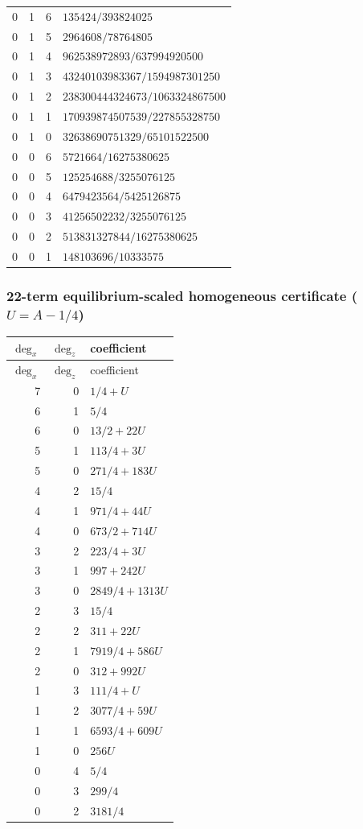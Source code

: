 \begin{longtable}{rrrl}
0 & 1 & 6 & $135424/393824025$\\
0 & 1 & 5 & $2964608/78764805$\\
0 & 1 & 4 & $962538972893/637994920500$\\
0 & 1 & 3 & $43240103983367/1594987301250$\\
0 & 1 & 2 & $238300444324673/1063324867500$\\
0 & 1 & 1 & $170939874507539/227855328750$\\
0 & 1 & 0 & $32638690751329/65101522500$\\
0 & 0 & 6 & $5721664/16275380625$\\
0 & 0 & 5 & $125254688/3255076125$\\
0 & 0 & 4 & $6479423564/5425126875$\\
0 & 0 & 3 & $41256502232/3255076125$\\
0 & 0 & 2 & $513831327844/16275380625$\\
0 & 0 & 1 & $148103696/10333575$\\
\bottomrule
\end{longtable}

\subsubsection*{22-term equilibrium-scaled homogeneous certificate ($U=A-1/4$)}
\begin{longtable}{rrl}
$\deg_{x}$ & $\deg_{z}$ & coefficient\\
\toprule
\endfirsthead
$\deg_{x}$ & $\deg_{z}$ & coefficient\\
\toprule
\endhead
7 & 0 & $1/4+U$\\
6 & 1 & $5/4$\\
6 & 0 & $13/2+22U$\\
5 & 1 & $113/4+3U$\\
5 & 0 & $271/4+183U$\\
4 & 2 & $15/4$\\
4 & 1 & $971/4+44U$\\
4 & 0 & $673/2+714U$\\
3 & 2 & $223/4+3U$\\
3 & 1 & $997+242U$\\
3 & 0 & $2849/4+1313U$\\
2 & 3 & $15/4$\\
2 & 2 & $311+22U$\\
2 & 1 & $7919/4+586U$\\
2 & 0 & $312+992U$\\
1 & 3 & $111/4+U$\\
1 & 2 & $3077/4+59U$\\
1 & 1 & $6593/4+609U$\\
1 & 0 & $256U$\\
0 & 4 & $5/4$\\
0 & 3 & $299/4$\\
0 & 2 & $3181/4$\\
\bottomrule
\end{longtable}

